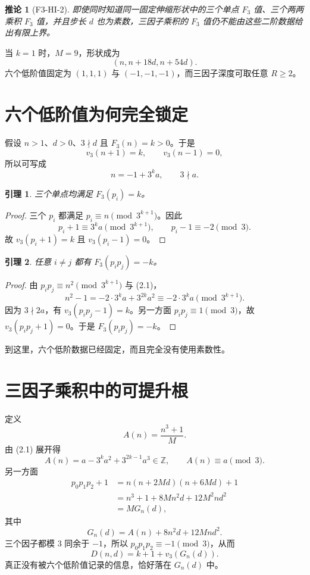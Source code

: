 \documentclass[11pt,a4paper]{ctexart}
\newtheorem{lemma}{引理}
\newtheorem{corollary}{推论}
\newcommand{\vthree}{v_3}
\newcommand{\Fthree}{F_3}
\begin{document}
\begin{corollary}[F3-HI-2]
即使同时知道同一固定伸缩形状中的三个单点 $F_3$ 值、三个两两乘积 $F_3$ 值，并且步长 $d$ 也为素数，三因子乘积的 $F_3$ 值仍不能由这些二阶数据给出有限上界。
\end{corollary}

当 $k=1$ 时，$M=9$，形状成为
\[
(n,n+18d,n+54d).
\]
六个低阶值固定为 $(1,1,1)$ 与 $(-1,-1,-1)$，而三因子深度可取任意 $R\ge2$。

\section{六个低阶值为何完全锁定}
假设 $n>1$、$d>0$、$3\nmid d$ 且 $\Fthree(n)=k>0$。于是
\[
\vthree(n+1)=k,\qquad \vthree(n-1)=0,
\]
所以可写成
\[
n=-1+3^k a,\qquad 3\nmid a. \tag{2.1}
\]

\begin{lemma}
三个单点均满足 $\Fthree(p_i)=k$。
\end{lemma}
\begin{proof}
三个 $p_i$ 都满足 $p_i\equiv n\pmod{3^{k+1}}$。因此
\[
p_i+1\equiv3^k a\pmod{3^{k+1}},
\qquad p_i-1\equiv-2\pmod3.
\]
故 $\vthree(p_i+1)=k$ 且 $\vthree(p_i-1)=0$。
\end{proof}

\begin{lemma}
任意 $i\ne j$ 都有 $\Fthree(p_ip_j)=-k$。
\end{lemma}
\begin{proof}
由 $p_ip_j\equiv n^2\pmod{3^{k+1}}$ 与 (2.1)，
\[
n^2-1=-2\cdot3^ka+3^{2k}a^2
\equiv-2\cdot3^ka\pmod{3^{k+1}}.
\]
因为 $3\nmid2a$，有 $\vthree(p_ip_j-1)=k$。另一方面 $p_ip_j\equiv1\pmod3$，故 $\vthree(p_ip_j+1)=0$。于是 $\Fthree(p_ip_j)=-k$。
\end{proof}

到这里，六个低阶数据已经固定，而且完全没有使用素数性。

\section{三因子乘积中的可提升根}
定义
\[
A(n)=\frac{n^3+1}{M}.
\]
由 (2.1) 展开得
\[
A(n)=a-3^ka^2+3^{2k-1}a^3\in\mathbb Z,
\qquad A(n)\equiv a\pmod3. \tag{3.1}
\]
另一方面
\[
\begin{aligned}
p_0p_1p_2+1
&=n(n+2Md)(n+6Md)+1\\
&=n^3+1+8Mn^2d+12M^2nd^2\\
&=M G_n(d),
\end{aligned}
\]
其中
\[
\boxed{G_n(d)=A(n)+8n^2d+12Mnd^2.} \tag{3.2}
\]
三个因子都模 $3$ 同余于 $-1$，所以 $p_0p_1p_2\equiv-1\pmod3$，从而
\[
\boxed{D(n,d)=k+1+\vthree(G_n(d)).} \tag{3.3}
\]
真正没有被六个低阶值记录的信息，恰好落在 $G_n(d)$ 中。
\end{document}

